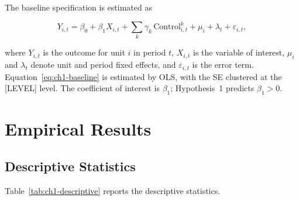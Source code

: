 \documentclass[../main.tex]{subfiles}
\begin{document}
The baseline specification is estimated as

\begin{equation}\label{eq:ch1-baseline}
    Y_{i,t} = \beta_0 + \beta_1 X_{i,t}
              + \sum_{k} \gamma_k \, \text{Control}^{k}_{i,t}
              + \mu_i + \lambda_t + \varepsilon_{i,t},
\end{equation}

\noindent where $Y_{i,t}$ is the outcome for unit $i$ in period $t$,
$X_{i,t}$ is the variable of interest, $\mu_i$ and $\lambda_t$ denote
unit and period fixed effects, and $\varepsilon_{i,t}$ is the error
term. Equation~\eqref{eq:ch1-baseline} is estimated by \ac{OLS}, with the
\ac{SE} clustered at the [LEVEL] level. The
coefficient of interest is $\beta_1$; Hypothesis~1 predicts
$\beta_1 > 0$.

\section{Empirical Results}\label{sec:ch1-results}

\subsection{Descriptive Statistics}

Table~\ref{tab:ch1-descriptive} reports the descriptive statistics.
\end{document}
